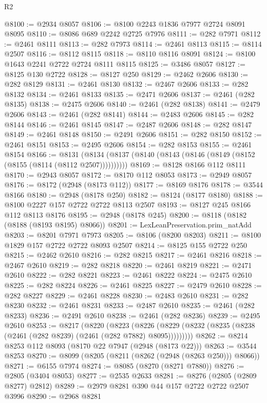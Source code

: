 \begin{lexlean}{R2}
\begin{coremodule}
@8100 := @2934 @8057
@8106 := @8100 @2243 @1836 @7977 @2724 @8091 @8095
@8110 := @8086 @689 @2242 @2725 @7976
@8111 := @282 @7971
@8112 := @2461 @8111
@8113 := @282 @7973
@8114 := @2461 @8113
@8115 := @8114 @2507
@8116 := @8112 @8115
@8118 := @8110 @8116 @8091
@8124 := @8100 @1643 @2241 @2722 @2724 @8111 @8115
@8125 := @3486 @8057
@8127 := @8125 @130 @2722
@8128 := @8127 @250
@8129 := @2462 @2606
@8130 := @282 @8129
@8131 := @2461 @8130
@8132 := @2467 @2606
@8133 := @282 @8132
@8134 := @2461 @8133
@8135 := @2471 @2606
@8137 := @2461 (@282 @8135)
@8138 := @2475 @2606
@8140 := @2461 (@282 @8138)
@8141 := @2479 @2606
@8143 := @2461 (@282 @8141)
@8144 := @2483 @2606
@8145 := @282 @8144
@8146 := @2461 @8145
@8147 := @2487 @2606
@8148 := @282 @8147
@8149 := @2461 @8148
@8150 := @2491 @2606
@8151 := @282 @8150
@8152 := @2461 @8151
@8153 := @2495 @2606
@8154 := @282 @8153
@8155 := @2461 @8154
@8166 := @8131 (@8134 (@8137 (@8140 (@8143 (@8146 (@8149 (@8152 (@8155 (@8114 (@8112 @2507))))))))))
@8169 := @8128 @8166 @112 @8111
@8170 := @2943 @8057
@8172 := @8170 @112 @8053
@8173 := @2949 @8057
@8176 := @8172 (@2948 (@8173 @112))
@8177 := @8169 @8176
@8178 := @3544 @8166
@8180 := @2948 (@8178 @250)
@8182 := @8124 (@8177 @8180)
@8188 := @8100 @2227 @157 @2722 @2722 @8113 @2507
@8193 := @8127 @245 @8166 @112 @8113 @8176
@8195 := @2948 (@8178 @245)
@8200 := @8118 (@8182 (@8188 (@8193 @8195) @8066))
@8201 := LexLeanPreservation.prim_natAdd
@8203 := @8201 @7971 @7973
@8205 := @8106 (@8200 @8203)
@8211 := @8100 @1829 @157 @2722 @2722 @8093 @2507
@8214 := @8125 @155 @2722 @250
@8215 := @2462 @2610
@8216 := @282 @8215
@8217 := @2461 @8216
@8218 := @2467 @2610
@8219 := @282 @8218
@8220 := @2461 @8219
@8221 := @2471 @2610
@8222 := @282 @8221
@8223 := @2461 @8222
@8224 := @2475 @2610
@8225 := @282 @8224
@8226 := @2461 @8225
@8227 := @2479 @2610
@8228 := @282 @8227
@8229 := @2461 @8228
@8230 := @2483 @2610
@8231 := @282 @8230
@8232 := @2461 @8231
@8233 := @2487 @2610
@8235 := @2461 (@282 @8233)
@8236 := @2491 @2610
@8238 := @2461 (@282 @8236)
@8239 := @2495 @2610
@8253 := @8217
    (@8220
      (@8223
        (@8226 (@8229 (@8232 (@8235 (@8238 (@2461 (@282 @8239) (@2461 (@282 @7882) @8095)))))))))
@8262 := @8214 @8253 @112 @8093 (@8170 @22 @7947 (@2948 (@8173 @22)))
@8263 := @3544 @8253
@8270 := @8099 (@8205 (@8211 (@8262 (@2948 (@8263 @250))) @8066))
@8271 := @6155 @7974
@8274 := @8085 (@8270 (@8271 @7880))
@8276 := @2805 (@3404 @8053)
@8277 := @2535 @2633
@8281 := @8276 (@2805 (@2809 @8277) @2812)
@8289 := @2979 @8281 @390 @44 @157 @2722 @2722 @2507 @3996
@8290 := @2968 @8281

\end{coremodule}
\end{lexlean}
